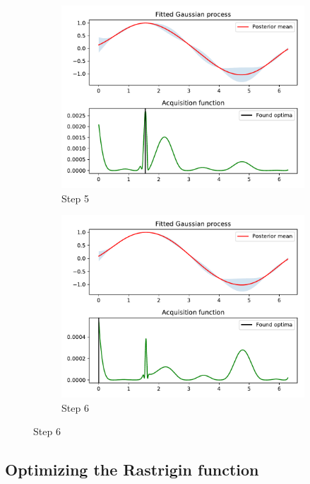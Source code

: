 \documentclass[10pt,a4paper,twoside]{book}
\begin{document}
\begin{figure}
	\begin{subfigure}[b]{0.45\textwidth}
		\caption{Step 5}
		\includegraphics[width=\textwidth]{figures/chapter3/sine/4.pdf}
	\end{subfigure}
	\begin{subfigure}[b]{0.45\textwidth}
		\caption{Step 6}
		\includegraphics[width=\textwidth]{figures/chapter3/sine/5.pdf}
	\end{subfigure}
\end{figure}


\subsection{Optimizing the Rastrigin function}
\end{document}
